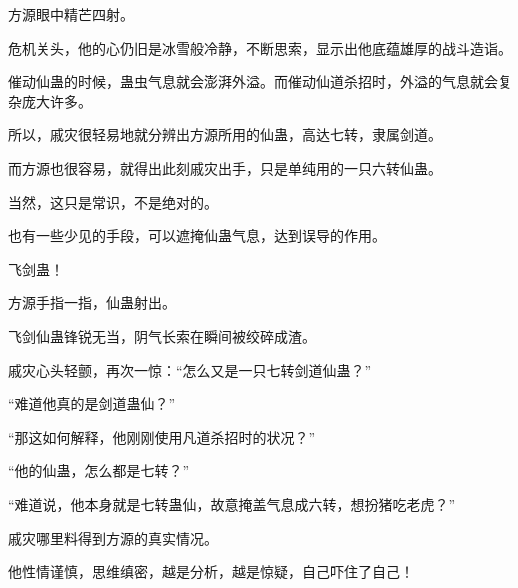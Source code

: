 \begin{this_body}
方源眼中精芒四射。

危机关头，他的心仍旧是冰雪般冷静，不断思索，显示出他底蕴雄厚的战斗造诣。

催动仙蛊的时候，蛊虫气息就会澎湃外溢。而催动仙道杀招时，外溢的气息就会复杂庞大许多。

所以，戚灾很轻易地就分辨出方源所用的仙蛊，高达七转，隶属剑道。

而方源也很容易，就得出此刻戚灾出手，只是单纯用的一只六转仙蛊。

当然，这只是常识，不是绝对的。

也有一些少见的手段，可以遮掩仙蛊气息，达到误导的作用。

飞剑蛊！

方源手指一指，仙蛊射出。

飞剑仙蛊锋锐无当，阴气长索在瞬间被绞碎成渣。

戚灾心头轻颤，再次一惊：“怎么又是一只七转剑道仙蛊？”

“难道他真的是剑道蛊仙？”

“那这如何解释，他刚刚使用凡道杀招时的状况？”

“他的仙蛊，怎么都是七转？”

“难道说，他本身就是七转蛊仙，故意掩盖气息成六转，想扮猪吃老虎？”

戚灾哪里料得到方源的真实情况。

他性情谨慎，思维缜密，越是分析，越是惊疑，自己吓住了自己！

\end{this_body}

